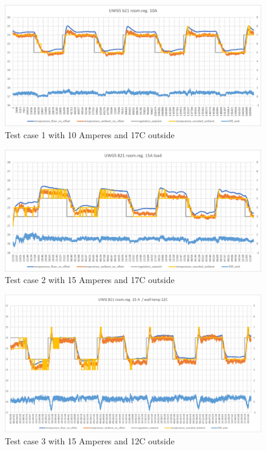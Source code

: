 \documentclass[../main.tex]{subfiles}
\begin{document}
\begin{figure}[htbp]
    \centering
    \includegraphics[width=1\linewidth]{figures/uwg5_test2.png}
    \caption{Test case 1 with 10 Amperes and 17\degree C outside}
    \label{fig:uwg5_testcase2}
\end{figure}
\begin{figure}[htbp]
    \centering
    \includegraphics[width=1\linewidth]{figures/uwg5_test3.png}
    \caption{Test case 2 with 15 Amperes and 17\degree C outside}
    \label{fig:uwg5_testcase3}
\end{figure}
\begin{figure}[htbp]
    \centering
    \includegraphics[width=1\linewidth]{figures/uwg5_test4.png}
    \caption{Test case 3 with 15 Amperes and 12\degree C outside}
    \label{fig:uwg5_testcase4}
\end{figure}

\end{document}
